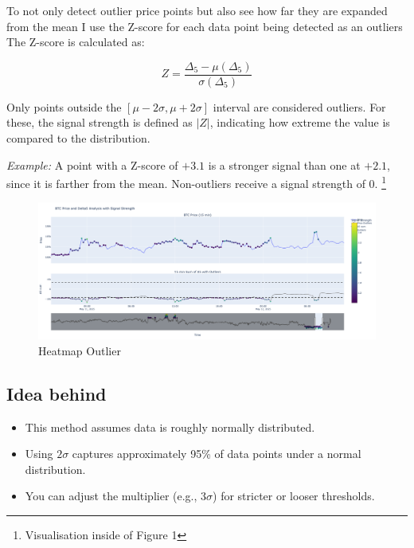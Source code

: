 \documentclass[12pt]{article}
\begin{document}
To not only detect outlier price points but also see how far they are expanded from the mean I use the Z-score for each data point being detected as an outliers
\newpage
The Z-score is calculated as:

\[
Z = \frac{\Delta_5 - \mu(\Delta_5)}{\sigma(\Delta_5)}
\]

Only points outside the $[\mu - 2\sigma, \mu + 2\sigma]$ interval are considered outliers.  
For these, the signal strength is defined as $|Z|$, indicating how extreme the value is compared to the distribution.

\textit{Example:}  
A point with a Z-score of $+3.1$ is a stronger signal than one at $+2.1$, since it is farther from the mean.  
Non-outliers receive a signal strength of 0. 
\footnote{Visualisation inside of Figure 1}





\begin{figure}
    \centering
    \includegraphics[width=1\textwidth]{imgs/zoomedin_outliers_strenght_signal_zscore.png}
    \caption{Heatmap Outlier}
\end{figure}




\newpage


\subsection*{Idea behind}

\begin{itemize}
    \item This method assumes data is roughly normally distributed.
    \item Using $2\sigma$ captures approximately 95\% of data points under a normal distribution.
    \item You can adjust the multiplier (e.g., $3\sigma$) for stricter or looser thresholds.
\end{itemize}
\end{document}
